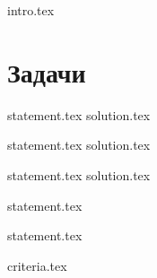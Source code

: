 {intro.tex}

\chapter{Задачи}

{statement.tex}
{solution.tex}

{statement.tex}
{solution.tex}

{statement.tex}
{solution.tex}

{statement.tex}

{statement.tex}

{criteria.tex}